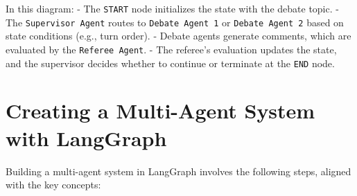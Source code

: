 \documentclass{article}
\begin{document}
In this diagram:
- The \texttt{START} node initializes the state with the debate topic.
- The \texttt{Supervisor Agent} routes to \texttt{Debate Agent 1} or \texttt{Debate Agent 2} based on state conditions (e.g., turn order).
- Debate agents generate comments, which are evaluated by the \texttt{Referee Agent}.
- The referee’s evaluation updates the state, and the supervisor decides whether to continue or terminate at the \texttt{END} node.

\section{Creating a Multi-Agent System with LangGraph}

Building a multi-agent system in LangGraph involves the following steps, aligned with the key concepts:
\end{document}
